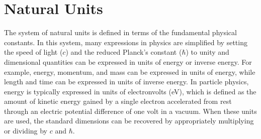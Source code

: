 \section{Natural Units}
The system of natural units is defined in terms of the fundamental physical constants.
In this system, many expressions in physics are simplified by setting the speed of light ($c$) and the reduced Planck's constant ($\hbar$) to unity and dimensional quantities can be expressed in units of energy or inverse energy.
For example, energy, momentum, and mass can be expressed in units of energy, while length and time can be expressed in units of inverse energy.
In particle physics, energy is typically expressed in units of electronvolts (\si{\eV}), which is defined as the amount of kinetic energy gained by a single electron accelerated from rest through an electric potential difference of one volt in a vacuum.
When these units are used, the standard dimensions can be recovered by appropriately multiplying or dividing by $c$ and $\hbar$.